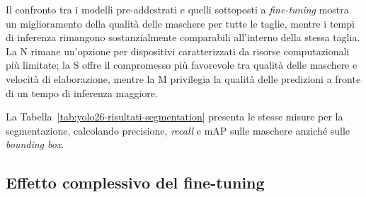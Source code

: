 Il confronto tra i modelli pre-addestrati e quelli sottoposti a \textit{fine-tuning} mostra un miglioramento della qualità delle maschere per tutte le taglie, mentre i tempi di inferenza rimangono sostanzialmente comparabili all'interno della stessa taglia. La N rimane un'opzione per dispositivi caratterizzati da risorse computazionali più limitate; la S offre il compromesso più favorevole tra qualità delle maschere e velocità di elaborazione, mentre la M privilegia la qualità delle predizioni a fronte di un tempo di inferenza maggiore.

La Tabella~\ref{tab:yolo26-risultati-segmentation} presenta le stesse misure per la segmentazione, calcolando precisione, \textit{recall} e mAP sulle maschere anziché sulle \textit{bounding box}.

\begin{table}[htbp]
    \centering
    \caption[Prestazioni dei modelli YOLO26-SEG]{Risultati dei modelli YOLO26-SEG sul \textit{test set}}
    \label{tab:yolo26-risultati-segmentation}
    \footnotesize
    \renewcommand{\arraystretch}{1.15}
\end{table}

\subsection{Effetto complessivo del fine-tuning}

